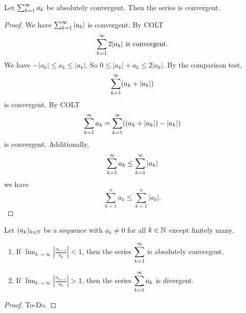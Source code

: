 \begin{theorem}\label{thm:sum_abs_convergence_implies_convergence}
    Let $\infsum[k = 1]a_k$ be absolutely convergent.
    Then the series is convergent.
\end{theorem}
\begin{proof}
    We have $\infsum[k = 1]|a_k|$ is convergent.
    By COLT
    \[
    \infsum[k = 1]2|a_k|\text{ is convergent}.
    \]
    We have $-|a_k| \leq a_k \leq |a_k|$.
    So $0 \leq |a_k| + a_k \leq 2|a_k|$.
    By the comparison test,
    \[
    \infsum[k = 1](a_k + |a_k|)
    \]
    is convergent.
    By COLT
    \[
    \infsum[k = 1]a_k = \infsum[k = 1]((a_k + |a_k|) - |a_k|)
    \]
    is convergent.
    Additionally,
    \[
    \infsum[k = 1]a_k \leq \infsum[k = 1]|a_k|
    \]
    we have
    \[
    \sum_{k = 1}^{n}a_k \leq \sum_{k = 1}^{n}|a_k|.
    \]
\end{proof}

\begin{theorem}\label{thm:sum_ratio_test}
    Let $\dseq[k]{a}$ be a sequence with $a_k \neq 0$ for all $k \in \N$ except finitely many.
    \begin{enumerate}[label = (\alph*)]
        \item If $\displaystyle\lim_{k \to \infty}\left|\frac{a_{k + 1}}{a_k}\right| < 1$,
        then the series $\displaystyle\infsum[k = 1]$ is absolutely convergent.
        \item If $\displaystyle\lim_{k \to \infty}\left|\frac{a_{k + 1}}{a_k}\right| > 1$,
        then the series $\displaystyle\infsum[k = 1]a_k$ is divergent.
    \end{enumerate}
\end{theorem}
\begin{proof}
    To-Do.
\end{proof}

